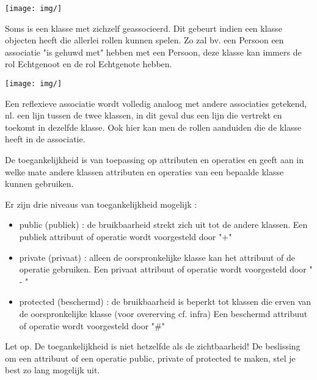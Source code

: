 \begin{center}
\texttt{[image: img/]}%
\label{labelname}%
\end{center}


Soms is een klasse met zichzelf geassocieerd. Dit gebeurt indien een klasse objecten heeft die allerlei rollen kunnen spelen. Zo zal bv. een Persoon een associatie "is gehuwd met" hebben met een Persoon, deze klasse kan immers de rol Echtgenoot en de rol Echtgenote hebben.


\begin{center}
\texttt{[image: img/]}%
\label{labelname}%
\end{center}

Een reflexieve associatie wordt volledig analoog met andere associaties getekend, nl. een lijn tussen de twee klassen, in dit geval dus een lijn die vertrekt en toekomt in dezelfde klasse. Ook hier kan men de rollen aanduiden die de klasse heeft in de associatie.


De toegankelijkheid is van toepassing op attributen en operaties en geeft aan in welke mate andere klassen attributen en operaties van een bepaalde klasse kunnen gebruiken.

Er zijn drie niveaus van toegankelijkheid mogelijk :

\begin{itemize}
    \item public (publiek) :
de bruikbaarheid strekt zich uit tot de andere klassen.
Een publiek attribuut of operatie wordt voorgesteld door "+"
    \item private (privaat) :
alleen de oorspronkelijke klasse kan het attribuut of de operatie gebruiken.
Een privaat attribuut of operatie wordt voorgesteld door " - "
    \item protected (beschermd) :
de bruikbaarheid is beperkt tot klassen die erven van de oorspronkelijke klasse (voor overerving cf. infra)
Een beschermd attribuut of operatie wordt voorgesteld door "\#"
\end{itemize}

Let op. De toegankelijkheid is niet hetzelfde als de zichtbaarheid!
De beslissing om een attribuut of een operatie public, private of protected te maken, stel je best zo lang mogelijk uit.

